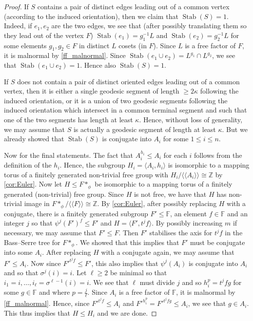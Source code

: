 \documentclass[11pt, a4paper]{amsart}
\theoremstyle{definition}
\newcommand{\isom}{\cong}
\newcommand{\F}{\mathbb{F}}
\newcommand{\Z}{\mathbb{Z}}
\newcommand{\normal}[1]{\langle\!\langle #1 \rangle\!\rangle}
\DeclareMathOperator{\stab}{Stab}
\begin{document}
\begin{proof}
If $S$ contains a pair of distinct edges leading out of a common vertex (according to the induced orientation), then we claim that $\stab(S) = 1$. Indeed, if $e_1, e_2$ are the two edges, we see that (after possibly translating them so they lead out of the vertex $F$) $\stab(e_1) = g_1^{-1}L$ and $\stab(e_2) = g_2^{-1}L$ for some elements $g_1, g_2\in F$ in distinct $L$ cosets (in $F$). Since $L$ is a free factor of $F$, it is malnormal by \cref{ff_malnormal}. Since $\stab(e_1\cup e_2) = L^{g_1}\cap L^{g_2}$, we see that $\stab(e_1\cup e_2) = 1$. Hence also $\stab(S) = 1$.

If $S$ does not contain a pair of distinct oriented edges leading out of a common vertex, then it is either a single geodesic segment of length $\geqslant 2\kappa$ following the induced orientation, or it is a union of two geodesic segments following the induced orientation which intersect in a common terminal segment and such that one of the two segments has length at least $\kappa$. Hence, without loss of generality, we may assume that $S$ is actually a geodesic segment of length at least $\kappa$. But we already showed that $\stab(S)$ is conjugate into $A_i$ for some $1\leqslant i\leqslant n$.

Now for the final statements. The fact that $A_{i}^{h_i}\leqslant A_{i}$ for each $i$ follows from the definition of the $h_i$. Hence, the subgroup $H_i = \langle A_{i}, h_i\rangle$ is isomorphic to a mapping torus of a finitely generated non-trivial free group with $H_i/ \normal{A_{i}} \isom \Z$ by \cref{cor:Euler}. Now let $H\leqslant F*_{\phi}$ be isomorphic to a mapping torus of a finitely generated (non-trivial) free group. Since $H$ is not free, we have that $H$ has non-trivial image in $F*_{\phi}/\normal{F} \isom \Z$. By \cref{cor:Euler}, after possibly replacing $H$ with a conjugate, there is a finitely generated subgroup $F'\leqslant \F$, an element $f\in \F$ and an integer $j$ so that $\psi^j(F')^f\leqslant F'$ and $H = \langle F', t^jf\rangle$. By possibly increasing $m$ if necessary, we may assume that $F'\leqslant F$. Then $F'$ stabilises the axis for $t^jf$ in the Bass--Serre tree for $F*_{\phi}$. We showed that this implies that $F'$ must be conjugate into some $A_i$. After replacing $H$ with a conjugate again, we may assume that $F'\leqslant A_i$. Now since $F'^{t^jf}\leqslant F'$, this also implies that $\psi^j(A_i)$ is conjugate into $A_i$ and so that $\sigma^j(i) = i$. Let $\ell\geqslant 2$ be minimal so that $i_1 = i, \ldots, i_{\ell} = \sigma^{\ell-1}(i) = i$. We see that $\ell$ must divide $j$ and so $h_i^p = t^jfg$ for some $g\in \F$ and where $p = \frac{j}{\ell}$. Since $A_i$ is a free factor of $\F$, it is malnormal by \cref{ff_malnormal}. Hence, since $F'^{t^jf} \leqslant A_i$ and $F'^{h_i^p} = F'^{t^jfg}\leqslant A_i$, we see that $g\in A_i$. This thus implies that $H\leqslant H_i$ and we are done.
\end{proof}
\end{document}
